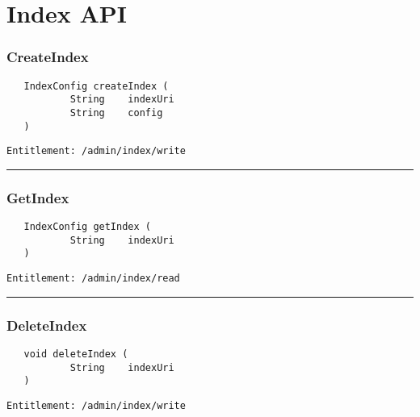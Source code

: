 \chapter{Index API}

\subsection{CreateIndex}
\label{Api:CreateIndex}
\begin{verbatim}
   IndexConfig createIndex (
           String    indexUri
           String    config
   )
\end{verbatim}
\begin{Verbatim}[fontsize=\small, formatcom=\color{Maroon}]
  Entitlement: /admin/index/write
\end{Verbatim}



\rule{12cm}{2pt}
\subsection{GetIndex}
\label{Api:GetIndex}
\begin{verbatim}
   IndexConfig getIndex (
           String    indexUri
   )
\end{verbatim}
\begin{Verbatim}[fontsize=\small, formatcom=\color{Maroon}]
  Entitlement: /admin/index/read
\end{Verbatim}



\rule{12cm}{2pt}
\subsection{DeleteIndex}
\label{Api:DeleteIndex}
\begin{verbatim}
   void deleteIndex (
           String    indexUri
   )
\end{verbatim}
\begin{Verbatim}[fontsize=\small, formatcom=\color{Maroon}]
  Entitlement: /admin/index/write
\end{Verbatim}



